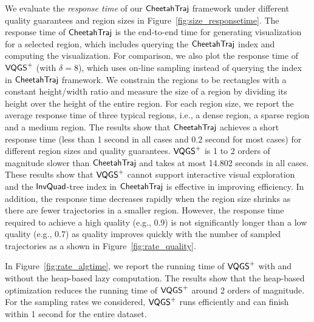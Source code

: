 We evaluate the \textit{response time} of our $\mathsf{CheetahTraj}$ framework under different quality guarantees and region sizes in Figure~\ref{fig:size_responsetime}.
The response time of $\mathsf{CheetahTraj}$ is the end-to-end time for generating visualization for a selected region, which includes querying the $\mathsf{CheetahTraj}$ index and computing the visualization.
For comparison, we also plot the response time of $\mathsf{VQGS}^+$ (with $\delta\!=\!8$), which uses on-line sampling instead of querying the index in $\mathsf{CheetahTraj}$ framework.
We constrain the regions to be rectangles with a constant height/width ratio and measure the size of a region by dividing its height over the height of the entire region.
For each region size, we report the average response time of three typical regions, i.e., a dense region, a sparse region and a medium region.
The results show that $\mathsf{CheetahTraj}$ achieves a short response time (less than 1 second in all cases and 0.2 second for most cases) for different region sizes and quality guarantees. $\mathsf{VQGS}^+$ is 1 to 2 orders of magnitude slower than $\mathsf{CheetahTraj}$ and takes at most 14.802 seconds in all cases. These results show that $\mathsf{VQGS}^+$ cannot support interactive visual exploration and the $\mathsf{InvQuad}$-tree index in $\mathsf{CheetahTraj}$ is effective in improving efficiency.
In addition, the response time decreases rapidly when the region size shrinks as there are fewer trajectories in a smaller region.
However, the response time required to achieve a high quality (e.g., 0.9) is not significantly longer than a low quality (e.g., 0.7) as quality improves quickly with the number of sampled trajectories as a shown in Figure~\ref{fig:rate_quality}.





In Figure~\ref{fig:rate_algtime}, we report the running time of $\mathsf{VQGS}^+$  with and without the heap-based lazy computation.
The results show that the heap-based optimization reduces the running time of $\mathsf{VQGS}^+$ around 2 orders of magnitude.
For the sampling rates we considered, $\mathsf{VQGS}^+$ runs efficiently and can finish within 1 second for the entire dataset.





